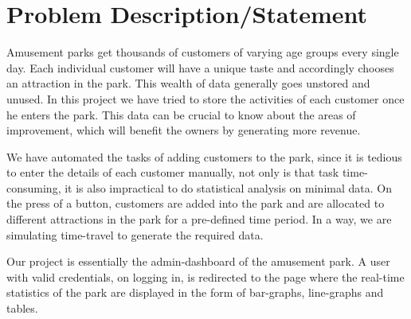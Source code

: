 \section{Problem Description/Statement}
Amusement parks get thousands of customers of varying age groups every single day.
Each individual customer will have a unique taste and accordingly chooses an attraction in the park.
This wealth of data generally goes unstored and unused.
In this project we have tried to store the activities of each customer once he enters the park.
This data can be crucial to know about the areas of improvement, which will benefit the owners by generating more revenue.

We have automated the tasks of adding customers to the park, since it is tedious to enter the details of each customer manually,
not only is that task time-consuming, it is also impractical to do statistical analysis on minimal data.
On the press of a button, customers are added into the park and are allocated to different attractions in the park for a
pre-defined time period. In a way, we are simulating time-travel to generate the required data.

Our project is essentially the admin-dashboard of the amusement park.
A user with valid credentials, on logging in, is redirected to the page where the real-time statistics of the park are displayed in the form of bar-graphs, line-graphs and tables.
\thispagestyle{fancy}
